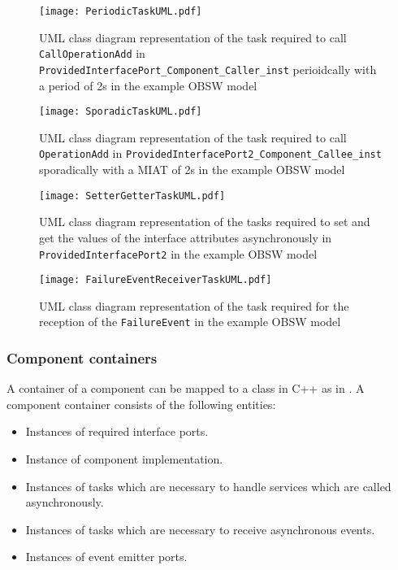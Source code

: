 \begin{figure}[h]
	\centering
	\texttt{[image: PeriodicTaskUML.pdf]}
	\caption{UML class diagram representation of the task required to call \texttt{CallOperationAdd} in \texttt{Provided\allowbreak Interface\allowbreak Port\allowbreak\_Component\allowbreak\_Caller\allowbreak\_inst} perioidcally with a period of 2s in the example OBSW model}
	\label{fig: Periodic task UML}
\end{figure}

\begin{figure}[h]
	\centering
	\texttt{[image: SporadicTaskUML.pdf]}
	\caption{UML class diagram representation of the task required to call \texttt{OperationAdd} in \texttt{Provided\allowbreak Interface\allowbreak Port2\allowbreak\_Component\allowbreak\_Callee\allowbreak\_inst} sporadically with a MIAT of 2s in the example OBSW model}
	\label{fig: Sporadic task UML}
\end{figure}

\begin{figure}[h]
	\centering
	\texttt{[image: SetterGetterTaskUML.pdf]}
	\caption{UML class diagram representation of the tasks required to set and get the values of the interface attributes asynchronously in \texttt{Provided\allowbreak Interface\allowbreak Port2} in the example OBSW model}
	\label{fig: Status value getter setter task UML}
\end{figure}

\begin{figure}[h]
	\centering
	\texttt{[image: FailureEventReceiverTaskUML.pdf]}
	\caption{UML class diagram representation of the task required for the reception of the \texttt{Failure\allowbreak Event} in the example OBSW model}
	\label{fig: Event receiver task UML}
\end{figure}

\subsubsection{\textbf{Component containers}}
A container of a component can be mapped to a class in C++ as in \cite{EvoRAVCodeAr}. A component container consists of the following entities:

\begin{itemize}
\item Instances of required interface ports.
\item Instance of component implementation.
\item Instances of tasks which are necessary to handle services which are called asynchronously. 
\item Instances of tasks which are necessary to receive asynchronous events.
\item Instances of event emitter ports.
\end{itemize}

